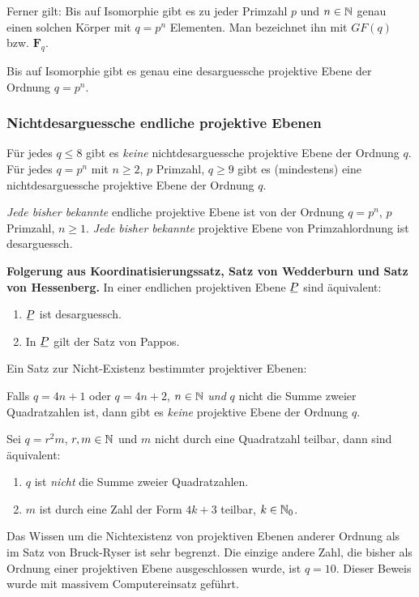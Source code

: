 Ferner gilt: Bis auf Isomorphie gibt es zu jeder Primzahl $p$ und $n \in \mathbb{N}$ genau einen solchen Körper mit $q = p^n$ Elementen. Man bezeichnet ihn mit $GF(q)$ bzw. $\mathbf{F}_q$.

Bis auf Isomorphie gibt es genau eine desarguessche projektive Ebene der Ordnung $q = p^n$.

\subsubsection*{Nichtdesarguessche endliche projektive Ebenen}
Für jedes $q \le 8$ gibt es \emph{keine} nichtdesarguessche projektive Ebene der Ordnung $q$. Für jedes $q = p^n$ mit $n \ge 2$, $p$ Primzahl, $q \ge 9$ gibt es (mindestens) eine nichtdesarguessche projektive Ebene der Ordnung $q$.

\emph{Jede bisher bekannte} endliche projektive Ebene ist von der Ordnung $q = p^n$, $p$ Primzahl, $n \ge 1$. \emph{Jede bisher bekannte} projektive Ebene von Primzahlordnung ist desarguessch.

\textbf{Folgerung aus Koordinatisierungssatz, Satz von Wedderburn und Satz von Hessenberg.}
In einer endlichen projektiven Ebene $\proj$ sind äquivalent:
\begin{enumerate}[(1)]
 \item $\proj$ ist desarguessch.
 \item In $\proj$ gilt der Satz von Pappos.
\end{enumerate}

Ein Satz zur Nicht-Existenz bestimmter projektiver Ebenen:
\begin{thm*}
 Falls $q = 4n+1$ oder $q = 4n+2$, $n \in \mathbb{N}$ \emph{und} $q$ nicht die Summe zweier Quadratzahlen ist, dann gibt es \emph{keine} projektive Ebene der Ordnung $q$.
\end{thm*}

\begin{bem}
 Sei $q = r^2 m$, $r,m \in \mathbb{N}$ und $m$ nicht durch eine Quadratzahl teilbar, dann sind äquivalent:
 \begin{enumerate}[(1)]
  \item $q$ ist \emph{nicht} die Summe zweier Quadratzahlen.
  \item $m$ ist durch eine Zahl der Form $4k+3$ teilbar, $k \in \mathbb{N}_0$.
 \end{enumerate}
\end{bem}

Das Wissen um die Nichtexistenz von projektiven Ebenen anderer Ordnung als im Satz von Bruck-Ryser ist sehr begrenzt. Die einzige andere Zahl, die bisher als Ordnung einer projektiven Ebene ausgeschlossen wurde, ist $q = 10$. Dieser Beweis wurde mit massivem Computereinsatz geführt.

